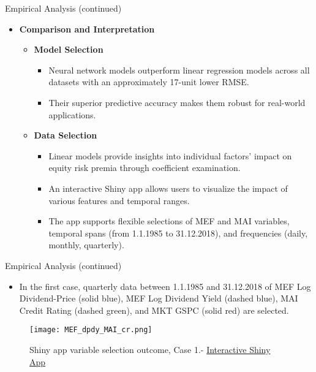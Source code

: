 \documentclass{beamer}
\begin{document}
\begin{frame}{Empirical Analysis (continued)}
    \begin{itemize}
        \item \textbf{Comparison and Interpretation}
        \begin{itemize}
            \item \textbf{Model Selection}
            \begin{itemize}
                \item Neural network models outperform linear regression models across all datasets with an approximately 17-unit lower RMSE. 
                \item Their superior predictive accuracy makes them robust for real-world applications.
            \end{itemize}
            
            \item \textbf{Data Selection}
            \begin{itemize}
                \item Linear models provide insights into individual factors' impact on equity risk premia through coefficient examination. 
                \item An interactive Shiny app allows users to visualize the impact of various features and temporal ranges. 
                \item The app supports flexible selections of MEF and MAI variables, temporal spans (from 1.1.1985 to 31.12.2018), and frequencies (daily, monthly, quarterly).
            \end{itemize}
        \end{itemize}
    \end{itemize}
\end{frame}


\begin{frame}{Empirical Analysis (continued)}
  \begin{itemize}
    \item In the first case, quarterly data between 1.1.1985 and 31.12.2018 of MEF Log Dividend-Price (solid blue), MEF Log Dividend Yield (dashed blue), MAI Credit Rating (dashed green), and MKT GSPC (solid red) are selected.
  \end{itemize}
    \begin{figure}[H]
        \centering
        \begin{minipage}{.80\textwidth}
            \centering
            \texttt{[image: MEF\_dpdy\_MAI\_cr.png]}
            \caption{Shiny app variable selection outcome, Case 1.- \href{https://baumender11.shinyapps.io/Alpha/}{Interactive Shiny App}}
            \label{fig:linear_prediction}
        \end{minipage}
    \end{figure}
\end{frame}
\end{document}
